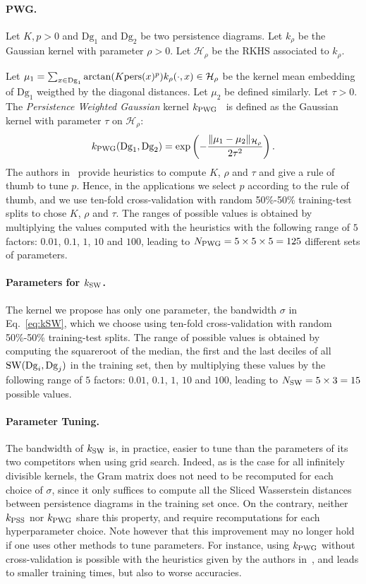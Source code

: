 \documentclass[11pt]{article}
\newcommand{\Dg}{\mathrm{Dg}}
\newcommand{\kPSS}{k_{\rm PSS}}
\newcommand{\kPWG}{k_{\rm PWG}}
\newcommand{\kSW}{k_{\rm SW}}
\newcommand{\SW}{{\rm SW}}
\begin{document}
\paragraph*{PWG.} Let $K,p>0$ and $\Dg_1$ and $\Dg_2$ be two persistence diagrams.
Let $k_\rho$ be the Gaussian kernel with parameter $\rho >0$.
Let $\mathcal{H}_\rho$ be the RKHS associated to $k_\rho$.

Let $\mu_1=\sum_{x\in \Dg_1}{\rm arctan}(K{\rm pers}(x)^p)k_\rho(\cdot,x)\in\mathcal{H}_\rho$ 
be the kernel mean embedding of $\Dg_1$ weigthed by the diagonal distances.
Let $\mu_2$ be defined similarly. Let $\tau >0$.
The {\em Persistence Weighted Gaussian} kernel $\kPWG$~\cite{Kusano16, Kusano17} is
defined as the Gaussian kernel with parameter $\tau$ on $\mathcal{H}_\rho$:
$$\kPWG(\Dg_1,\Dg_2)={\rm exp}\left(-\frac{\|\mu_1-\mu_2\|_{\mathcal{H}_\rho}}{2\tau^2}\right).$$
The authors in~\cite{Kusano16} provide heuristics to compute $K$, $\rho$ and $\tau$
and give a rule of thumb to tune $p$. Hence, in the applications we select $p$ according to the rule of thumb, and
 we use ten-fold cross-validation with random 50\%-50\% training-test splits to chose $K$, $\rho$ and $\tau$. 
The ranges of possible values is obtained 
by multiplying the values computed with the heuristics
with the following range of $5$ factors: $0.01$, $0.1$, $1$, $10$ and $100$,
leading to $N_{\rm PWG}=5\times 5\times 5=125$ different sets of parameters. \\

\paragraph*{Parameters for $\kSW$.} The kernel we propose has only one parameter, the bandwidth $\sigma$ in Eq.~\ref{eq:kSW}, 
which we choose
using ten-fold cross-validation with random 50\%-50\% training-test splits. 
The range of possible values is obtained by computing the squareroot of the median, the first and the last deciles 
of all $\SW(\Dg_i,\Dg_j)$ in the training set,
then by multiplying these values by the following range of $5$ factors: $0.01$, $0.1$, $1$, $10$ and $100$, 
leading to $N_{\rm SW}=5\times 3= 15$ possible values. 


\paragraph*{Parameter Tuning.} The bandwidth of $\kSW$ is, in practice, easier to tune than the parameters of its two competitors
when using grid search. Indeed, as is the case for all infinitely divisible kernels, the Gram matrix does not need to be 
recomputed for each choice of $\sigma$, since it only suffices to compute all the Sliced Wasserstein distances between persistence diagrams 
in the training set once. On the contrary, neither $\kPSS$ nor $\kPWG$ share this property, and require recomputations for each hyperparameter choice.
Note however that this improvement may no longer hold if one uses other methods to tune parameters.  
For instance, using $\kPWG$ without cross-validation is possible with the heuristics given by the authors in~\cite{Kusano16}, 
and leads to smaller training times, but also to worse accuracies. 
\end{document}
